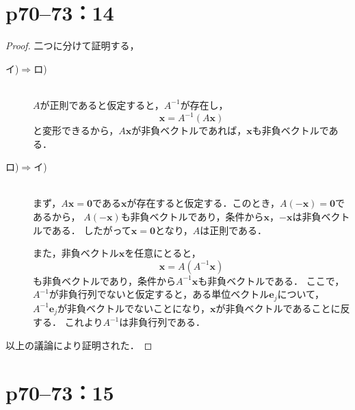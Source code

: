 \documentclass[a4paper,10pt,fleqn]{ltjsarticle}
\begin{document}
\newpage


\section*{p70--73：14}

\begin{leftbar}
    \begin{proof}
        二つに分けて証明する，
        \begin{description}
            \item[イ)$\Longrightarrow$ロ)] \mbox{} \\
                  $A$が正則であると仮定すると，$A^{-1}$が存在し，
                  \[
                      \bm{x} = A^{-1} (A\bm{x})
                  \]
                  と変形できるから，$A \bm{x}$が非負ベクトルであれば，$\bm{x}$も非負ベクトルである．
            \item[ロ)$\Longrightarrow$イ)] \mbox{} \\
                  まず，$ A \bm{x} =\bm{0}$である$\bm{x}$が存在すると仮定する．このとき，$A (-\bm{x}) =\bm{0}$であるから，
                  $A (-\bm{x})$も非負ベクトルであり，条件から$ \bm{x}$，$-\bm{x}$は非負ベクトルである．
                  したがって$\bm{x}=\bm{0}$となり，$A$は正則である．

                  また，非負ベクトル$\bm{x}$を任意にとると，
                  \[
                      \bm{x} = A (A^{-1} \bm{x})
                  \]
                  も非負ベクトルであり，条件から$A^{-1} \bm{x}$も非負ベクトルである．
                  ここで，$A^{-1}$が非負行列でないと仮定すると，ある単位ベクトル$\bm{e}_j$について，
                  $A^{-1} \bm{e}_j $が非負ベクトルでないことになり，$\bm{x}$が非負ベクトルであることに反する．
                  これより$A^{-1}$は非負行列である．
        \end{description}
        以上の議論により証明された．
    \end{proof}
\end{leftbar}


\newpage



\section*{p70--73：15}
\end{document}

